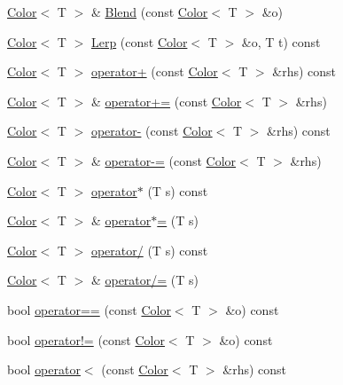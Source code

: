 \begin{DoxyCompactItemize}
\hyperlink{classastu_1_1Color}{Color}$<$ T $>$ \& \hyperlink{classastu_1_1Color_a33b9d43c6d2306ccd7e3071e0e52eb25}{Blend} (const \hyperlink{classastu_1_1Color}{Color}$<$ T $>$ \&o)
\item 
\hyperlink{classastu_1_1Color}{Color}$<$ T $>$ \hyperlink{classastu_1_1Color_acc63e1fac50adf874fa5b33516186e7f}{Lerp} (const \hyperlink{classastu_1_1Color}{Color}$<$ T $>$ \&o, T t) const
\item 
\hyperlink{classastu_1_1Color}{Color}$<$ T $>$ \hyperlink{classastu_1_1Color_a7f1c0093d51c4036f7ab5755d571d6e7}{operator+} (const \hyperlink{classastu_1_1Color}{Color}$<$ T $>$ \&rhs) const
\item 
\hyperlink{classastu_1_1Color}{Color}$<$ T $>$ \& \hyperlink{classastu_1_1Color_ab4cafbc5cbd4aa28a8feb428107d3985}{operator+=} (const \hyperlink{classastu_1_1Color}{Color}$<$ T $>$ \&rhs)
\item 
\hyperlink{classastu_1_1Color}{Color}$<$ T $>$ \hyperlink{classastu_1_1Color_a2d512332791d4187ecde51771648cb9c}{operator-\/} (const \hyperlink{classastu_1_1Color}{Color}$<$ T $>$ \&rhs) const
\item 
\hyperlink{classastu_1_1Color}{Color}$<$ T $>$ \& \hyperlink{classastu_1_1Color_add622a013366f3f07eee482493c2c158}{operator-\/=} (const \hyperlink{classastu_1_1Color}{Color}$<$ T $>$ \&rhs)
\item 
\hyperlink{classastu_1_1Color}{Color}$<$ T $>$ \hyperlink{classastu_1_1Color_aa1fc446d899409058a6e510775ae009d}{operator$\ast$} (T s) const
\item 
\hyperlink{classastu_1_1Color}{Color}$<$ T $>$ \& \hyperlink{classastu_1_1Color_ab097615260001619304f4d128b484359}{operator$\ast$=} (T s)
\item 
\hyperlink{classastu_1_1Color}{Color}$<$ T $>$ \hyperlink{classastu_1_1Color_af4b143f6c4c3b15412293a25f05320b2}{operator/} (T s) const
\item 
\hyperlink{classastu_1_1Color}{Color}$<$ T $>$ \& \hyperlink{classastu_1_1Color_a8411cf3d645429dbcdc609a8db010c68}{operator/=} (T s)
\item 
bool \hyperlink{classastu_1_1Color_a3cfd5f7a4157b012c4ca1df92289e525}{operator==} (const \hyperlink{classastu_1_1Color}{Color}$<$ T $>$ \&o) const
\item 
bool \hyperlink{classastu_1_1Color_a03214300c75b0737cd91679f758112c5}{operator!=} (const \hyperlink{classastu_1_1Color}{Color}$<$ T $>$ \&o) const
\item 
bool \hyperlink{classastu_1_1Color_a3ff28065c93ca64d4806186118eef206}{operator$<$} (const \hyperlink{classastu_1_1Color}{Color}$<$ T $>$ \&rhs) const
\end{DoxyCompactItemize}
